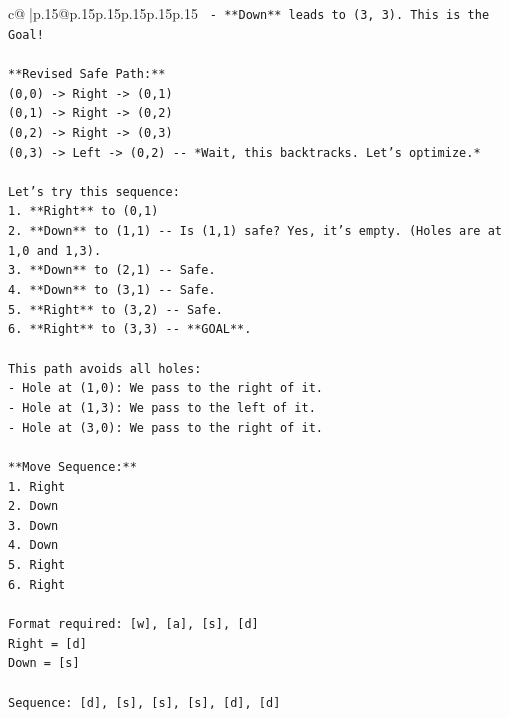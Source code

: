 \documentclass{article}
\begin{document}
{\begin{supertabular}{c@{$\;$}|p{.15\linewidth}@{}p{.15\linewidth}p{.15\linewidth}p{.15\linewidth}p{.15\linewidth}p{.15\linewidth}}
{{{\texttt{        {-} **Down** leads to (3, 3). This is the Goal!} \\
\\ 
\texttt{**Revised Safe Path:**} \\
\texttt{(0,0) {-}> Right {-}> (0,1)} \\
\texttt{(0,1) {-}> Right {-}> (0,2)} \\
\texttt{(0,2) {-}> Right {-}> (0,3)} \\
\texttt{(0,3) {-}> Left {-}> (0,2) {-}{-} *Wait, this backtracks. Let's optimize.*} \\
\\ 
\texttt{Let's try this sequence:} \\
\texttt{1.  **Right** to (0,1)} \\
\texttt{2.  **Down** to (1,1) {-}{-} Is (1,1) safe? Yes, it's empty. (Holes are at 1,0 and 1,3).} \\
\texttt{3.  **Down** to (2,1) {-}{-} Safe.} \\
\texttt{4.  **Down** to (3,1) {-}{-} Safe.} \\
\texttt{5.  **Right** to (3,2) {-}{-} Safe.} \\
\texttt{6.  **Right** to (3,3) {-}{-} **GOAL**.} \\
\\ 
\texttt{This path avoids all holes:} \\
\texttt{{-} Hole at (1,0): We pass to the right of it.} \\
\texttt{{-} Hole at (1,3): We pass to the left of it.} \\
\texttt{{-} Hole at (3,0): We pass to the right of it.} \\
\\ 
\texttt{**Move Sequence:**} \\
\texttt{1.  Right} \\
\texttt{2.  Down} \\
\texttt{3.  Down} \\
\texttt{4.  Down} \\
\texttt{5.  Right} \\
\texttt{6.  Right} \\
\\ 
\texttt{Format required: {[}w{]}, {[}a{]}, {[}s{]}, {[}d{]}} \\
\texttt{Right = {[}d{]}} \\
\texttt{Down = {[}s{]}} \\
\\ 
\texttt{Sequence: {[}d{]}, {[}s{]}, {[}s{]}, {[}s{]}, {[}d{]}, {[}d{]}} \\
}}}
\end{supertabular}}
\end{document}

